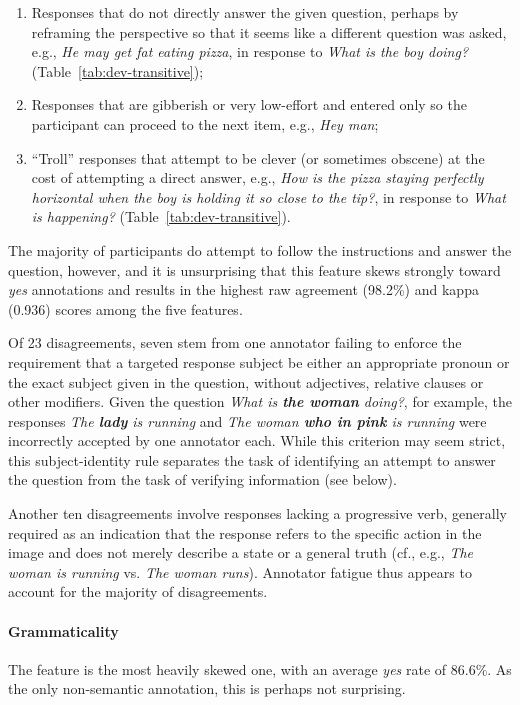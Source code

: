 \begin{enumerate}
\item Responses that do not directly answer the given question, perhaps by reframing the perspective so that it seems like a different question was asked, e.g., \textit{He may get fat eating pizza}, in response to \textit{What is the boy doing?} (Table~\ref{tab:dev-transitive});
\item Responses that are gibberish or very low-effort and entered only so the participant can proceed to the next item, e.g., \textit{Hey man};
\item ``Troll'' responses that attempt to be clever (or sometimes obscene) at the cost of attempting a direct answer, e.g., \textit{How is the pizza staying perfectly horizontal when the boy is holding it so close to the tip?}, in response to \textit{What is happening?} (Table~\ref{tab:dev-transitive}).
\end{enumerate}

The majority of participants do attempt to follow the instructions and answer the question, however, and it is unsurprising that this feature skews strongly toward \textit{yes} annotations and results in the highest raw agreement (98.2\%) and kappa (0.936) scores among the five features.

Of 23 disagreements, seven stem from one annotator failing to enforce the requirement that a targeted response subject be either an appropriate pronoun or the exact subject given in the question, without adjectives, relative clauses or other modifiers. Given the question \textit{What is \textbf{the woman} doing?}, for example, the responses \textit{The \textbf{lady} is running} and \textit{The woman \textbf{who in pink} is running} were incorrectly accepted by one annotator each.  While this criterion may seem strict, this subject-identity rule separates the task of identifying an attempt to answer the question from the task of verifying information (see  below).

Another ten disagreements involve responses lacking a progressive verb, generally required as an indication that the response refers to the specific action in the image and does not merely describe a state or a general truth (cf., e.g., \textit{The woman is running} vs. \textit{The woman runs}). Annotator fatigue thus appears to account for the majority of  disagreements.

\paragraph{Grammaticality} The  feature is the most heavily skewed one, with an average \textit{yes} rate of 86.6\%.  As the only non-semantic annotation, this is perhaps not surprising.


